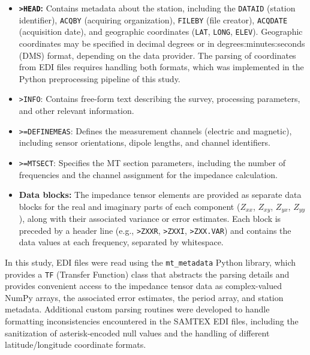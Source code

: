 \begin{itemize}
    \item \textbf{\texttt{>HEAD}:} Contains metadata about the station, including the \texttt{DATAID} (station identifier), \texttt{ACQBY} (acquiring organization), \texttt{FILEBY} (file creator), \texttt{ACQDATE} (acquisition date), and geographic coordinates (\texttt{LAT}, \texttt{LONG}, \texttt{ELEV}). Geographic coordinates may be specified in decimal degrees or in degrees:minutes:seconds (DMS) format, depending on the data provider. The parsing of coordinates from EDI files requires handling both formats, which was implemented in the Python preprocessing pipeline of this study.

    \item \texttt{>INFO}: Contains free-form text describing the survey, processing parameters, and other relevant information.

    \item \texttt{>=DEFINEMEAS}: Defines the measurement channels (electric and magnetic), including sensor orientations, dipole lengths, and channel identifiers.

    \item \texttt{>=MTSECT}: Specifies the MT section parameters, including the number of frequencies and the channel assignment for the impedance calculation.

    \item \textbf{Data blocks:} The impedance tensor elements are provided as separate data blocks for the real and imaginary parts of each component ($Z_{xx}$, $Z_{xy}$, $Z_{yx}$, $Z_{yy}$), along with their associated variance or error estimates. Each block is preceded by a header line (e.g., \texttt{>ZXXR}, \texttt{>ZXXI}, \texttt{>ZXX.VAR}) and contains the data values at each frequency, separated by whitespace.
\end{itemize}

In this study, EDI files were read using the \texttt{mt\_metadata} Python library, which provides a \texttt{TF} (Transfer Function) class that abstracts the parsing details and provides convenient access to the impedance tensor data as complex-valued NumPy arrays, the associated error estimates, the period array, and station metadata. Additional custom parsing routines were developed to handle formatting inconsistencies encountered in the SAMTEX EDI files, including the sanitization of asterisk-encoded null values and the handling of different latitude/longitude coordinate formats.

